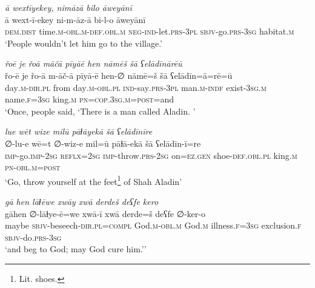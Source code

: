 \ea \label{DG.23}
\textit{ā wextīyekey, nimāzā bilo āweyānī} \\ 
\gll ā wext-ī-ekey ni-m-āz-ā bi-l-o āweyānī \\ 
 \textsc{dem.dist} time\textsc{.m}\textsc{-obl}\textsc{.m}\textsc{-def}\textsc{.obl}\textsc{.m} \textsc{neg-}\textsc{ind-}let\textsc{.prs}\textsc{-3pl} \textsc{sbjv-}go\textsc{.prs}\textsc{-3sg} habitat\textsc{\textsc{.m}} \\ 
\glt `People wouldn’t let him go to the village.'
\z 
 
\ea \label{DG.24}
\textit{řoē je řoā māčā pīyāē hen nāmēš šā ʕelādīnārēū} \\ 
\gll řo-ē je řo-ā m-āč-ā pīyā-ē hen-∅ nāmē=š šā ʕelādīn=ā=rē=ū \\ 
 day\textsc{.m}\textsc{-dir}\textsc{.pl} from day\textsc{.m}\textsc{-obl}\textsc{.pl} \textsc{ind-}say\textsc{.prs}\textsc{-3pl} man\textsc{.m}\textsc{-indf} exist\textsc{-3sg}\textsc{.m} name\textsc{\textsc{.f}}\textsc{=3sg} king\textsc{.m} \textsc{pn}\textsc{=cop}\textsc{.3sg}\textsc{.m}\textsc{=\textsc{post}}=and \\ 
\glt `Once, people said, ‘There is a man called Aladin. '
\z 
 
\ea \label{DG.27}
\textit{lue wēt wize milū pāɫāyekā šā ʕelādīnīre} \\ 
\gll ∅-lu-e wē=t ∅-wiz-e mil=ū pāɫā-ekā šā ʕelādīn-ī=re \\ 
 \textsc{imp-}go.\textsc{imp-}\textsc{2sg} \textsc{reflx}\textsc{=\textsc{2sg}} \textsc{imp-}throw\textsc{.prs}-\textsc{2sg} on\textsc{=ez}\textsc{.gen} shoe\textsc{-def}\textsc{.obl}\textsc{.pl} king\textsc{.m} \textsc{pn}\textsc{-obl}\textsc{.m}\textsc{=\textsc{post}} \\ 
\glt `Go, throw yourself at the feet\footnote{Lit. shoes.} of Shah Aladin'
\z 
 
\ea \label{DG.28}
\textit{gā hen lāɫēwe xwāy xwā derdeš deʕfe kero} \\ 
\gll gāhen ∅-lāɫye-ē=we xwā-ī xwā derde=š deʕfe ∅-ker-o \\ 
 maybe \textsc{sbjv-}beseech\textsc{-dir}\textsc{.pl}\textsc{=\textsc{compl}} God\textsc{.m}\textsc{-obl}\textsc{.m} God\textsc{.m} illness\textsc{\textsc{.f}}\textsc{=3sg} exclusion\textsc{\textsc{.f}} \textsc{sbjv-}do\textsc{.prs}\textsc{-3sg} \\ 
\glt `and beg to God; may God cure him.’'
\z 
 

